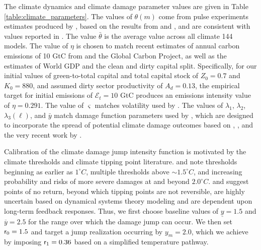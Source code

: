 \documentclass[12pt]{article}
\begin{document}
\begin{appendices}
The climate dynamics and climate damage parameter values are given in Table \ref{table:climate_parameters}. The values of $\theta(m)$ come from pulse experiments estimates produced by \cite{BarnettBrockHansen:2021}, based on the results from \cite{Joosetal:2013} and \cite{Geoffroy:2013}, and are consistent with values reported in \cite{IPCC:2021}. The value $\bar{\theta}$ is the average value across all climate 144 models. The value of $\eta$ is chosen to match recent estimates of annual carbon emissions of 10 GtC from \cite{Figueresetal:2018} and the Global Carbon Project, as well as the estimates of World GDP and the clean and dirty capital split. Specifically, for our initial values of green-to-total capital and total capital stock of $Z_0 = 0.7$ and $K_0 = 880$, and assumed dirty sector productivity of $A_d = 0.13$, the empirical target for initial emissions of $\mathcal{E}_t = 10$ GtC produces an emissions intensity value of $\eta = 0.291$. The value of $\varsigma$ matches volatility used by \cite{BarnettBrockHansen:2021}. The values of $\lambda_1$, $\lambda_2$, $\lambda_3(\ell)$, and $\bar{y}$ match damage function parameters used by \cite{BarnettBrockHansenZhang:2023}, which are designed to incorporate the spread of potential climate damage outcomes based on \cite{Nordhaus:2019}, \cite{Weitzman:2012}, and the very recent work by \cite{waidelich2024climate}. 

Calibration of the climate damage jump intensity function is motivated by the climate thresholds and climate tipping point literature. \cite{Drijfhoutetal:2015, armstrong2022exceeding, Rogelj:2018} and \cite{Rogelj:2019} note thresholds beginning as earlier as $1^{\circ}C$, multiple thresholds above $\sim 1.5^{\circ}C$, and increasing probability and risks of more severe damages at and beyond $2.0^{\circ}C$. \cite{Ritchieetal:2021} and \cite{hansen2025global} suggest points of no return, beyond which tipping points are not reversible, are highly uncertain based on dynamical systems theory modeling and are dependent upon long-term feedback responses. Thus, we first choose baseline values of ${\underline y} = 1.5$ and ${\overline y} = 2.5$ for the range over which the damage jump can occur. We then set ${\sf r}_0 = 1.5$ and target a jump realization occurring by $y_m = 2.0$, which we achieve by imposing ${\sf r}_1 = 0.36$ based on a simplified temperature pathway.



\end{appendices}
\end{document}
